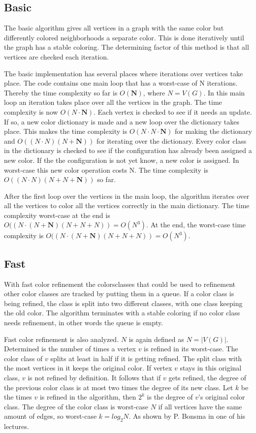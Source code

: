 \documentclass[twoside]{article}
\begin{document}
\begin{multicols}{2}
\subsection{Basic}
The basic algorithm gives all vertices in a graph with the same color but differently colored neighborhoods a separate color. This is done iteratively until the graph has a stable coloring. The determining factor of this method is that all vertices are checked each iteration. 

The basic implementation has several places where iterations over vertices take place. The code contains one main loop that has a worst-case of N iterations. Thereby the time complexity so far is $O(\boldsymbol{N})$, where $N = V(G)$. In this main loop an iteration takes place over all the vertices in the graph. The time complexity is now $O(N \cdot \boldsymbol{N})$. Each vertex is checked to see if it needs an update. If so, a new color dictionary is made and a new loop over the dictionary takes place. This makes the time complexity is $O(N \cdot N \cdot \boldsymbol{N})$ for making the dictionary and $O((N \cdot N)(N+\boldsymbol{N}))$ for iterating over the dictionary. Every color class in the dictionary is checked to see if the configuration has already been assigned a new color. If the the configuration is not yet know, a new color is assigned. In worst-case this new color operation costs N. The time complexity is $O((N \cdot N)(N+N+\boldsymbol{N}))$ so far.

After the first loop over the vertices in the main loop, the algorithm iterates over all the vertices to color all the vertices correctly in the main dictionary. The time complexity worst-case at the end is $O((N \cdot (N+\boldsymbol{N})(N+N+N)) = O(N^3)$. At the end, the worst-case time complexity is $O((N \cdot (N+\boldsymbol{N})(N+N+N)) = O(N^3)$.


\subsection{Fast}
With fast color refinement the colorsclasses that could be used to refinement other color classes are tracked by putting them in a queue. If a color class is being refined, the class is split into two different classes, with one class keeping the old color. The algorithm terminates with a stable coloring if no color class needs refinement, in other words the queue is empty. 

Fast color refinement is also analyzed. $N$ is again defined as $N=|V(G)|$. Determined is the number of times a vertex $v$ is refined in its worst-case. The color class of $v$ splits at least in half if it is getting refined. The split class with the most vertices in it keeps the original color. If vertex $v$ stays in this original class, $v$ is not refined by definition. It follows that if $v$ gets refined, the degree of the previous color class is at most two times the degree of its new class. Let $k$ be the times $v$ is refined in the algorithm, then $2^k$ is the degree of $v$'s original color class.  The degree of the color class is worst-case $N$ if all vertices have the same amount of edges, so worst-case $k=log_2 N$. As shown by P. Bonsma in one of his lectures. \cite{presentation:slidesPartIII}


\end{multicols}
\end{document}
